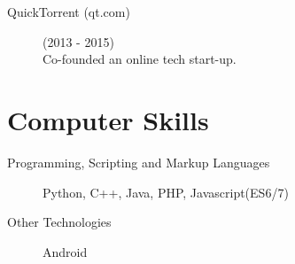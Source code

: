\documentclass[margin,line,a4paper]{resume}
\begin{document}
\begin{resume}
            \begin{description}
            	\item [QuickTorrent (qt.com)] (2013 - 2015) \\
            	Co-founded an online tech start-up.
            \end{description}

        \section{\mysidestyle Computer Skills}
            \begin{description}
                \item [Programming, Scripting and Markup Languages]
	                Python, C++, Java, PHP, Javascript(ES6/7)
	                
                \item [Other Technologies] Android
            \end{description}

    \end{resume}
\end{document}
